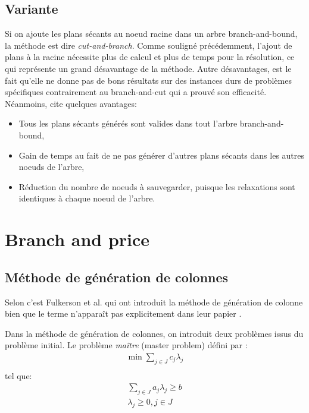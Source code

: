 \documentclass[12pt,a4paper,oneside]{book}
\theoremstyle{definition}
\begin{document}
		\subsection{Variante}
		Si on ajoute les plans sécants au noeud racine dans un arbre branch-and-bound, la méthode est dire \textit{cut-and-branch}. Comme souligné précédemment, l'ajout de plans à la racine nécessite plus de calcul et plus de temps pour la résolution, ce qui représente un grand désavantage de la méthode. Autre désavantages, est le fait qu'elle ne donne pas de bons résultats sur des instances durs de problèmes spécifiques contrairement au branch-and-cut qui a prouvé son efficacité. Néanmoins, \cite{mitchellbranch} cite quelques avantages:
		\begin{itemize}
		    \item Tous les plans sécants générés sont valides dans tout l'arbre branch-and-bound,
		    \item Gain de temps au fait de ne pas générer d'autres plans sécants dans les autres noeuds de l'arbre,
		    \item Réduction du nombre de noeuds à sauvegarder, puisque les relaxations sont identiques à chaque noeud de l'arbre. 
		\end{itemize}
		

	\section{Branch and price}
	
	    
		\subsection{Méthode de génération de colonnes}
			
			Selon \cite{nemhauser2012column} c'est Fulkerson et al. qui ont introduit la méthode de génération de colonne bien que le terme n'apparaît pas explicitement dans leur papier \cite{fulkerson1971blocking}. 
			
			Dans la méthode de génération de colonnes, on introduit deux problèmes issus du problème initial. \cite{desrosiers2010branch}
			Le problème \textit{maître} (master problem) défini par :
			\begin{gather}\label{master_prob}
			    \min \sum_{j \in J} c_j \lambda_j \\
	        \end{gather}
			tel que: 
			\begin{gather*}
			    \sum_{j \in J} a_j \lambda_j \geq b \\
			    \lambda_j \geq 0, j \in J
			\end{gather*}
			 
\end{document}
